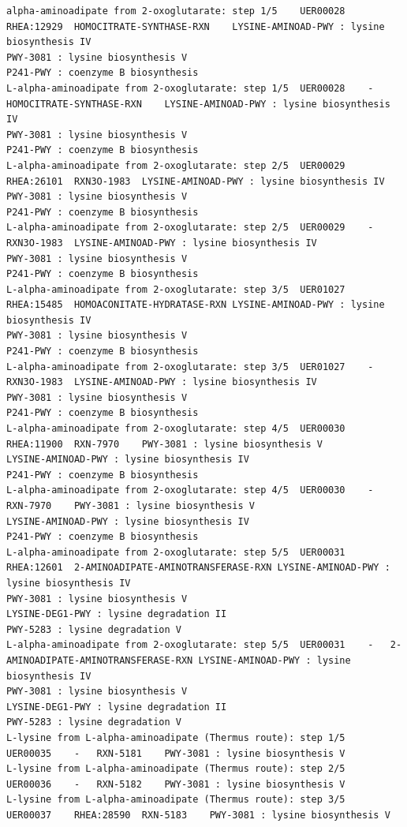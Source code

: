 \begin{adjustbox}{width=\textwidth}
\begin{lstlisting}[basicstyle=\tiny\normalfont\ttfamily,tabsize=2,showtabs=true,caption=AAA\_uer\_metacyc.tsv]
alpha-aminoadipate from 2-oxoglutarate: step 1/5	UER00028	RHEA:12929	HOMOCITRATE-SYNTHASE-RXN	LYSINE-AMINOAD-PWY : lysine biosynthesis IV 
PWY-3081 : lysine biosynthesis V 
P241-PWY : coenzyme B biosynthesis 
L-alpha-aminoadipate from 2-oxoglutarate: step 1/5	UER00028	-	HOMOCITRATE-SYNTHASE-RXN	LYSINE-AMINOAD-PWY : lysine biosynthesis IV 
PWY-3081 : lysine biosynthesis V 
P241-PWY : coenzyme B biosynthesis 
L-alpha-aminoadipate from 2-oxoglutarate: step 2/5	UER00029	RHEA:26101	RXN3O-1983	LYSINE-AMINOAD-PWY : lysine biosynthesis IV 
PWY-3081 : lysine biosynthesis V 
P241-PWY : coenzyme B biosynthesis 
L-alpha-aminoadipate from 2-oxoglutarate: step 2/5	UER00029	-	RXN3O-1983	LYSINE-AMINOAD-PWY : lysine biosynthesis IV 
PWY-3081 : lysine biosynthesis V 
P241-PWY : coenzyme B biosynthesis 
L-alpha-aminoadipate from 2-oxoglutarate: step 3/5	UER01027	RHEA:15485	HOMOACONITATE-HYDRATASE-RXN	LYSINE-AMINOAD-PWY : lysine biosynthesis IV 
PWY-3081 : lysine biosynthesis V 
P241-PWY : coenzyme B biosynthesis 
L-alpha-aminoadipate from 2-oxoglutarate: step 3/5	UER01027	-	RXN3O-1983	LYSINE-AMINOAD-PWY : lysine biosynthesis IV 
PWY-3081 : lysine biosynthesis V 
P241-PWY : coenzyme B biosynthesis 
L-alpha-aminoadipate from 2-oxoglutarate: step 4/5	UER00030	RHEA:11900	RXN-7970	PWY-3081 : lysine biosynthesis V 
LYSINE-AMINOAD-PWY : lysine biosynthesis IV 
P241-PWY : coenzyme B biosynthesis 
L-alpha-aminoadipate from 2-oxoglutarate: step 4/5	UER00030	-	RXN-7970	PWY-3081 : lysine biosynthesis V 
LYSINE-AMINOAD-PWY : lysine biosynthesis IV 
P241-PWY : coenzyme B biosynthesis 
L-alpha-aminoadipate from 2-oxoglutarate: step 5/5	UER00031	RHEA:12601	2-AMINOADIPATE-AMINOTRANSFERASE-RXN	LYSINE-AMINOAD-PWY : lysine biosynthesis IV 
PWY-3081 : lysine biosynthesis V 
LYSINE-DEG1-PWY : lysine degradation II 
PWY-5283 : lysine degradation V 
L-alpha-aminoadipate from 2-oxoglutarate: step 5/5	UER00031	-	2-AMINOADIPATE-AMINOTRANSFERASE-RXN	LYSINE-AMINOAD-PWY : lysine biosynthesis IV 
PWY-3081 : lysine biosynthesis V 
LYSINE-DEG1-PWY : lysine degradation II 
PWY-5283 : lysine degradation V 
L-lysine from L-alpha-aminoadipate (Thermus route): step 1/5	UER00035	-	RXN-5181	PWY-3081 : lysine biosynthesis V 
L-lysine from L-alpha-aminoadipate (Thermus route): step 2/5	UER00036	-	RXN-5182	PWY-3081 : lysine biosynthesis V 
L-lysine from L-alpha-aminoadipate (Thermus route): step 3/5	UER00037	RHEA:28590	RXN-5183	PWY-3081 : lysine biosynthesis V 

\end{lstlisting}
\end{adjustbox}
